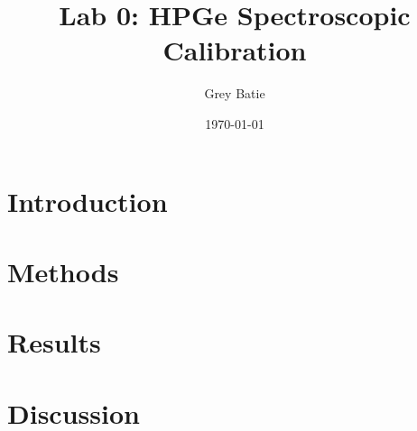 \documentclass[11pt]{article}
\title{Lab 0: HPGe Spectroscopic Calibration}
\author{Grey Batie}
\date{\today}
\begin{document}
\maketitle

\section*{Introduction}
\label{sec:intro}


\section*{Methods}
\label{sec:meth}


\section*{Results}
\label{sec:res}


\section*{Discussion}
\label{sec:disc}




\end{document}
